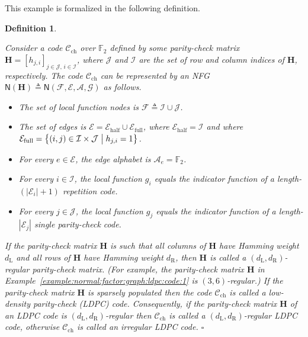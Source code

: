 \documentclass[journal, twocolumn]{IEEEtran}
\renewcommand{\mathbf}[1]{{\bm{#1}}}
\newcommand{\matr}[1]{\mathbf{#1}}
\newcommand{\code}[1]{\mathcal{#1}}
\newcommand{\set}[1]{\mathcal{#1}}
\newcommand{\graph}[1]{\mathsf{#1}}
\newcommand{\GF}[1]{\mathbb{F}_{#1}}
\newcommand{\defeq}{\triangleq}
\newcommand{\codeCchannel}{\code{C}_{\mathrm{ch}}}
\newcommand{\matrH}{\matr{H}}
\newcommand{\setA}{\set{A}}
\newcommand{\setE}{\set{E}}
\newcommand{\setEfull}{\set{E}_{\mathrm{full}}}
\newcommand{\setEhalf}{\set{E}_{\mathrm{half}}}
\newcommand{\setF}{\set{F}}
\newcommand{\setG}{\set{G}}
\newcommand{\setI}{\set{I}}
\newcommand{\setJ}{\set{J}}
\newcommand{\dleft}{d_{\mathrm{L}}}
\newcommand{\dright}{d_{\mathrm{R}}}
\newcommand{\graphN}{\graph{N}}
\newcommand{\?}{\mathrm{?}}
\newcommand{\qedwhite}{\hspace*{\fill}%
  $\square$\smallskip}
\newcommand{\defend}{\qedwhite}
\newtheorem{Definition}[Lemma]{Definition}
\begin{document}
This example is formalized in the following definition.


\begin{Definition}
  \label{def:normal:factor:graph:ldpc:code:1}  

  Consider a code $\codeCchannel$ over $\GF{2}$ defined by some parity-check
  matrix $\matrH = [h_{j,i}]_{j \in \setJ, \, i \in \setI}$, where $\setJ$ and
  $\setI$ are the set of row and column indices of $\matrH$, respectively. The
  code $\codeCchannel$ can be represented by an NFG $\graphN(\matrH) \defeq
  \graphN(\setF,\setE, \setA, \setG)$ as follows.
  \begin{itemize}
    
  \item The set of local function nodes is $\setF \defeq \setI \cup \setJ$.

  \item The set of edges is $\setE = \setEhalf \cup \setEfull$, where
    $\setEhalf = \setI$ and where $\setEfull = \bigl\{ (i,j) \in \setI \times
    \setJ \bigm| h_{j,i} = 1 \bigr\}$.

  \item For every $e \in \setE$, the edge alphabet is $\setA_e = \GF{2}$.

  \item For every $i \in \setI$, the local function $g_i$ equals the indicator
    function of a length-$(|\setE_i| \! + \! 1)$ repetition code.

  \item For every $j \in \setJ$, the local function $g_j$ equals the indicator
    function of a length-$|\setE_j|$ single parity-check code.

  \end{itemize}
  If the parity-check matrix $\matrH$ is such that all columns of $\matrH$
  have Hamming weight $\dleft$ and all rows of $\matrH$ have Hamming weight
  $\dright$, then $\matrH$ is called a $(\dleft, \dright)$-regular
  parity-check matrix. (For example, the parity-check matrix $\matrH$ in
  Example~\ref{example:normal:factor:graph:ldpc:code:1} is $(3,6)$-regular.)
  If the parity-check matrix $\matrH$ is sparsely populated then the code
  $\codeCchannel$ is called a low-density parity-check (LDPC)
  code. Consequently, if the parity-check matrix $\matrH$ of an LDPC code is
  $(\dleft, \dright)$-regular then $\codeCchannel$ is called a $(\dleft,
  \dright)$-regular LDPC code, otherwise $\codeCchannel$ is called an
  irregular LDPC code.  \defend
\end{Definition}
\end{document}
